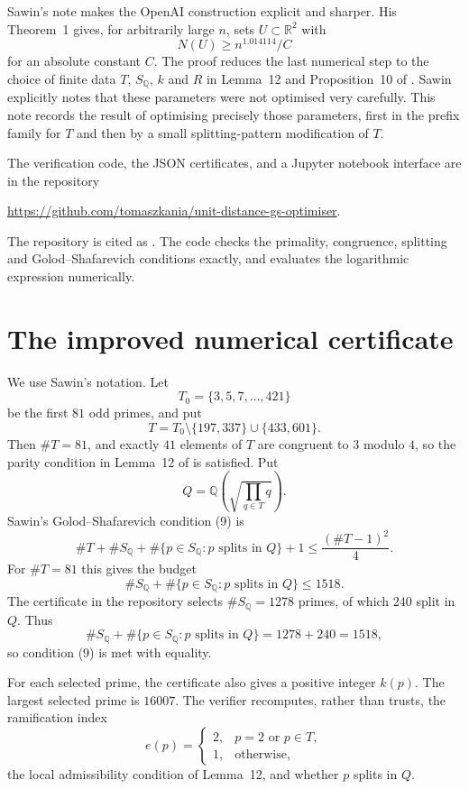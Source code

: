 \documentclass[11pt]{amsart}
\newcommand{\RR}{\mathbb{R}}
\newcommand{\QQ}{\mathbb{Q}}
\newcommand{\SQ}{S_{\QQ}}
\begin{document}
Sawin's note \cite{SawinExplicitLowerBound} makes the OpenAI construction explicit and sharper.  His Theorem~1 gives, for arbitrarily large $n$, sets $U \subset \RR^2$ with
\[
  N(U) \geqslant n^{1.014114}/C
\]
for an absolute constant $C$.  The proof reduces the last numerical step to the choice of finite data $T$, $\SQ$, $k$ and $R$ in Lemma~12 and Proposition~10 of \cite{SawinExplicitLowerBound}.  Sawin explicitly notes that these parameters were not optimised very carefully.  This note records the result of optimising precisely those parameters, first in the prefix family for $T$ and then by a small splitting-pattern modification of $T$.

The verification code, the JSON certificates, and a Jupyter notebook interface are in the repository
\begin{center}
  \url{https://github.com/tomaszkania/unit-distance-gs-optimiser}.
\end{center}
The repository is cited as \cite{KaniaRepo}.  The code checks the primality, congruence, splitting and Golod--Shafarevich conditions exactly, and evaluates the logarithmic expression numerically.

\section{The improved numerical certificate}

We use Sawin's notation.  Let
\[
  T_0=\{3,5,7,\ldots,421\}
\]
be the first $81$ odd primes, and put
\[
  T=T_0\setminus\{197,337\}\cup\{433,601\}.
\]
Then $\#T=81$, and exactly $41$ elements of $T$ are congruent to $3$ modulo $4$, so the parity condition in Lemma~12 of \cite{SawinExplicitLowerBound} is satisfied.  Put
\[
  Q=\QQ\!\left(\sqrt{\prod_{q\in T}q}\right).
\]
Sawin's Golod--Shafarevich condition (9) is
\[
  \#T+\#\SQ+\#\{p\in \SQ:p\text{ splits in }Q\}+1
  \leqslant \frac{(\#T-1)^2}{4}.
\]
For $\#T=81$ this gives the budget
\[
  \#\SQ+\#\{p\in \SQ:p\text{ splits in }Q\}\leqslant 1518.
\]
The certificate in the repository selects $\#\SQ=1278$ primes, of which $240$ split in $Q$.  Thus
\[
  \#\SQ+\#\{p\in \SQ:p\text{ splits in }Q\}=1278+240=1518,
\]
so condition (9) is met with equality.

For each selected prime, the certificate also gives a positive integer $k(p)$.  The largest selected prime is $16007$.  The verifier recomputes, rather than trusts, the ramification index
\[
  e(p)=
  \begin{cases}
    2,& p=2\text{ or }p\in T,\\
    1,& \text{otherwise},
  \end{cases}
\]
the local admissibility condition of Lemma~12, and whether $p$ splits in $Q$.
\end{document}
